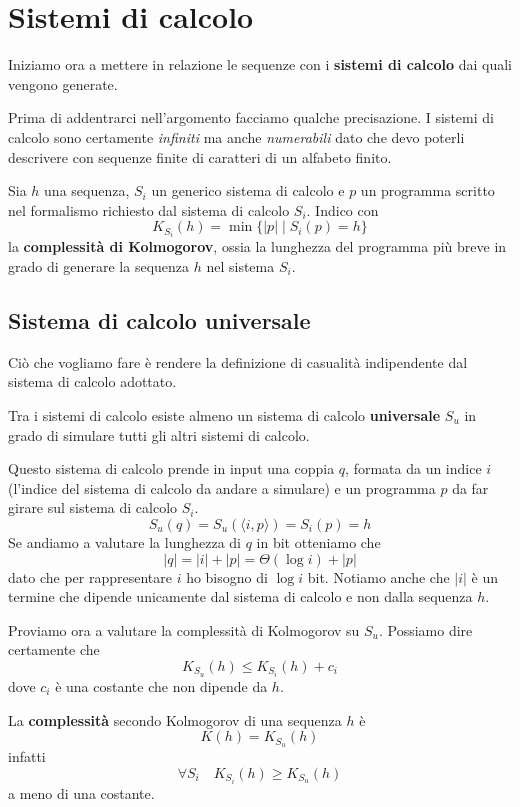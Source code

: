 \section{Sistemi di calcolo}\label{sistemi_calcolo}
Iniziamo ora a mettere in relazione le sequenze con i \textbf{sistemi di calcolo} dai quali vengono generate.

Prima di addentrarci nell'argomento facciamo qualche precisazione. I sistemi di calcolo sono certamente \emph{infiniti}
ma anche \emph{numerabili} dato che devo poterli descrivere con sequenze finite di caratteri di un alfabeto finito.

\begin{definition}
	Sia $h$ una sequenza, $S_i$ un generico sistema di calcolo e $p$ un programma scritto nel formalismo richiesto dal
	sistema di calcolo $S_i$. Indico con
	\[ K_{S_i}(h) = \min\{ |p| \mid S_i(p) = h \} \]
	la \textbf{complessit\`a di Kolmogorov}, ossia la lunghezza del programma pi\`u breve in grado di generare la
	sequenza $h$ nel sistema $S_i$.
\end{definition}

\subsection{Sistema di calcolo universale}
Ci\`o che vogliamo fare \`e rendere la definizione di casualit\`a indipendente dal sistema di calcolo adottato.

Tra i sistemi di calcolo esiste almeno un sistema di calcolo \textbf{universale} $S_u$ in grado di simulare tutti gli
altri sistemi di calcolo.

Questo sistema di calcolo prende in input una coppia $q$, formata da un indice $i$ (l'indice del sistema di calcolo da
andare a simulare) e un programma $p$ da far girare sul sistema di calcolo $S_i$.
\[ S_u(q) =  S_u (\langle i, p \rangle) = S_i (p) = h \]
Se andiamo a valutare la lunghezza di $q$ in bit otteniamo che
\[ |q| = |i| + |p| = \Theta (\log i) + |p| \]
dato che per rappresentare $i$ ho bisogno di $\log i$ bit. Notiamo anche che $|i|$ \`e un termine che dipende unicamente
dal sistema di calcolo e non dalla sequenza $h$.

Proviamo ora a valutare la complessit\`a di Kolmogorov su $S_u$. Possiamo dire certamente che
\[ K_{S_u}(h) \leq K_{S_i}(h) + c_i \]
dove $c_i$ \`e una costante che non dipende da $h$.

\begin{definition}
	La \textbf{complessit\`a} secondo Kolmogorov di una sequenza $h$ \`e
	\[ K(h) = K_{S_u}(h) \]
	infatti
	\[ \forall S_i \quad K_{S_i}(h) \geq K_{S_u}(h) \]
	a meno di una costante.
\end{definition}

